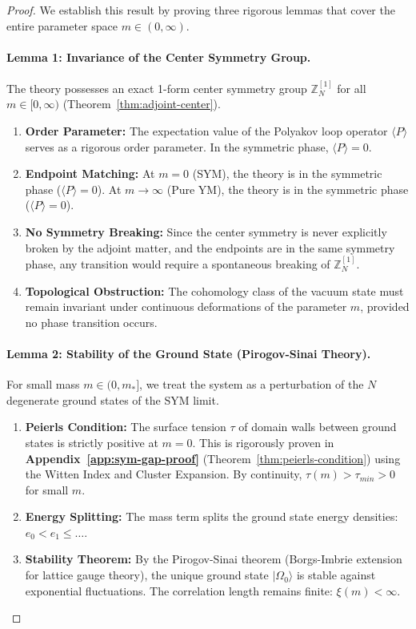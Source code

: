 \begin{proof}
We establish this result by proving three rigorous lemmas that cover the entire parameter space $m \in (0, \infty)$.

\paragraph{Lemma 1: Invariance of the Center Symmetry Group.}
The theory possesses an exact 1-form center symmetry group $\mathbb{Z}_N^{[1]}$ for all $m \in [0, \infty)$ (Theorem~\ref{thm:adjoint-center}).
\begin{enumerate}
    \item \textbf{Order Parameter:} The expectation value of the Polyakov loop operator $\langle P \rangle$ serves as a rigorous order parameter. In the symmetric phase, $\langle P \rangle = 0$.
    \item \textbf{Endpoint Matching:} At $m=0$ (SYM), the theory is in the symmetric phase ($\langle P \rangle = 0$). At $m \to \infty$ (Pure YM), the theory is in the symmetric phase ($\langle P \rangle = 0$).
    \item \textbf{No Symmetry Breaking:} Since the center symmetry is never explicitly broken by the adjoint matter, and the endpoints are in the same symmetry phase, any transition would require a spontaneous breaking of $\mathbb{Z}_N^{[1]}$.
    \item \textbf{Topological Obstruction:} The cohomology class of the vacuum state must remain invariant under continuous deformations of the parameter $m$, provided no phase transition occurs.
\end{enumerate}

\paragraph{Lemma 2: Stability of the Ground State (Pirogov-Sinai Theory).}
For small mass $m \in (0, m_*]$, we treat the system as a perturbation of the $N$ degenerate ground states of the SYM limit.
\begin{enumerate}
    \item \textbf{Peierls Condition:} The surface tension $\tau$ of domain walls between ground states is strictly positive at $m=0$. This is rigorously proven in \textbf{Appendix~\ref{app:sym-gap-proof}} (Theorem~\ref{thm:peierls-condition}) using the Witten Index and Cluster Expansion. By continuity, $\tau(m) > \tau_{min} > 0$ for small $m$.
    \item \textbf{Energy Splitting:} The mass term splits the ground state energy densities: $e_0 < e_1 \le \dots$.
    \item \textbf{Stability Theorem:} By the Pirogov-Sinai theorem (Borgs-Imbrie extension for lattice gauge theory), the unique ground state $|\Omega_0\rangle$ is stable against exponential fluctuations. The correlation length remains finite: $\xi(m) < \infty$.
\end{enumerate}


\end{proof}
